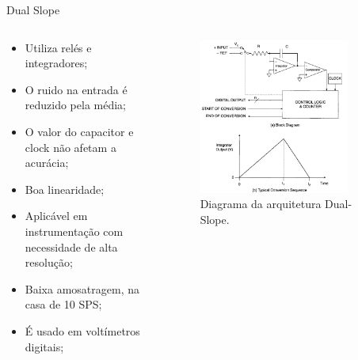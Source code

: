 \documentclass{beamer}
\begin{document}
\begin{frame}{Dual Slope}
\begin{columns}
    \begin{column}{0.50\textwidth}
		\begin{itemize}
			\item Utiliza relés e integradores;
			\item O ruido na entrada é reduzido pela média;
			\item O valor do capacitor e clock não afetam a acurácia;
			\item Boa linearidade;
			\item Aplicável em instrumentação com necessidade de alta resolução;
			\item Baixa amosatragem, na casa de 10 SPS;
			\item É usado em voltímetros digitais;
		\end{itemize}
    \end{column}

    \begin{column}{0.5\textwidth}
		\begin{figure}[H]
		    \centering
		    \begin{center}
		    \includegraphics[width=0.85\textwidth]{img/dual-slope}
		  \caption{Diagrama da arquitetura Dual-Slope.}
		    \label{fig:sar}
		  \end{center}
		\end{figure}
    \end{column}
\end{columns}
\end{frame}
\end{document}

